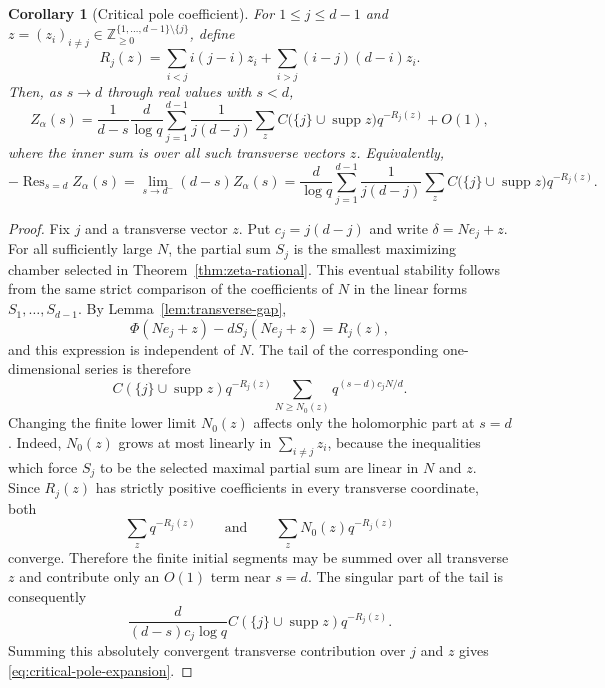 \documentclass[11pt]{amsart}
\newcommand{\ZZ}{\mathbb Z}
\newcommand{\supp}{\operatorname{supp}}
\theoremstyle{plain}
\newtheorem{corollary}[theorem]{Corollary}
\theoremstyle{definition}
\numberwithin{equation}{section}
\begin{document}
\begin{corollary}[Critical pole coefficient]\label{cor:critical-pole-coefficient}
For $1\le j\le d-1$ and
$z=(z_i)_{i\ne j}\in\ZZ_{\ge0}^{\{1,\ldots,d-1\}\setminus\{j\}}$, define
\begin{equation}\label{eq:Rj-z}
  R_j(z)=\sum_{i<j}i(j-i)z_i+\sum_{i>j}(i-j)(d-i)z_i.
\end{equation}
Then, as $s\to d$ through real values with $s<d$,
\begin{equation}\label{eq:critical-pole-expansion}
  Z_\alpha(s)
  =\frac{1}{d-s}\frac{d}{\log q}
  \sum_{j=1}^{d-1}\frac1{j(d-j)}
  \sum_{z}
  C\bigl(\{j\}\cup\supp z\bigr)q^{-R_j(z)}
  +O(1),
\end{equation}
where the inner sum is over all such transverse vectors $z$.  Equivalently,
\begin{equation}\label{eq:critical-pole-limit}
  -\operatorname{Res}_{s=d}Z_\alpha(s)
  =\lim_{s\to d^-}(d-s)Z_\alpha(s)
  =\frac{d}{\log q}
  \sum_{j=1}^{d-1}\frac1{j(d-j)}
  \sum_z C\bigl(\{j\}\cup\supp z\bigr)q^{-R_j(z)}.
\end{equation}
\end{corollary}

\begin{proof}
Fix $j$ and a transverse vector $z$.  Put $c_j=j(d-j)$ and write
$\delta=Ne_j+z$.  For all sufficiently large $N$, the partial sum $S_j$ is the smallest
maximizing chamber selected in Theorem~\ref{thm:zeta-rational}.  This eventual stability follows
from the same strict comparison of the coefficients of $N$ in the linear forms
$S_1,\ldots,S_{d-1}$.  By Lemma~\ref{lem:transverse-gap},
\[
  \Phi(Ne_j+z)-dS_j(Ne_j+z)=R_j(z),
\]
and this expression is independent of $N$.  The tail of the corresponding one-dimensional
series is therefore
\[
  C(\{j\}\cup\supp z)q^{-R_j(z)}
  \sum_{N\ge N_0(z)}q^{(s-d)c_jN/d}.
\]
Changing the finite lower limit $N_0(z)$ affects only the holomorphic part at $s=d$.
Indeed, $N_0(z)$ grows at most linearly in $\sum_{i\ne j}z_i$, because the inequalities
which force $S_j$ to be the selected maximal partial sum are linear in $N$ and $z$.  Since
$R_j(z)$ has strictly positive coefficients in every transverse coordinate, both
\[
  \sum_z q^{-R_j(z)}
  \qquad\text{and}\qquad
  \sum_z N_0(z)q^{-R_j(z)}
\]
converge.  Therefore the finite initial segments may be summed over all transverse $z$ and
contribute only an $O(1)$ term near $s=d$.  The singular part of the tail is consequently
\[
  \frac{d}{(d-s)c_j\log q}
  C(\{j\}\cup\supp z)q^{-R_j(z)}.
\]
Summing this absolutely convergent transverse contribution over $j$ and $z$ gives
\eqref{eq:critical-pole-expansion}.
\end{proof}
\end{document}
